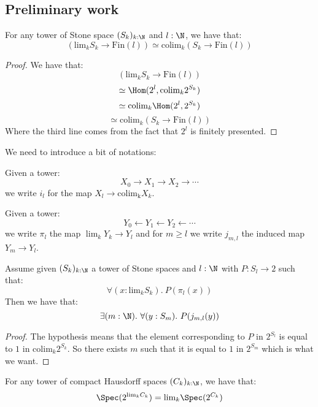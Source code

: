 \subsection{Preliminary work}

\begin{lemma}\label{factorisation-stone-finite}
For any tower of Stone space $(S_k)_{k:\N}$ and $l:\N$, we have that:
\[\left(\mathrm{lim}_kS_k\to \mathrm{Fin}(l)\right) \simeq \mathrm{colim}_k (S_k\to \mathrm{Fin}(l))\]
\end{lemma}

\begin{proof}
We have that:
\[\left(\mathrm{lim}_kS_k\to \mathrm{Fin}(l)\right) \]
\[\simeq \Hom(2^l, \mathrm{colim}_k 2^{S_k})\]
\[\simeq \mathrm{colim}_k \Hom(2^l, 2^{S_k}) \]
\[\simeq \mathrm{colim}_k (S_k\to \mathrm{Fin}(l))\]
Where the third line comes from the fact that $2^l$ is finitely presented.
\end{proof}

We need to introduce a bit of notations:

Given a tower: 
\[X_0 \to X_1\to X_2\to \cdots \]
we write $i_l$ for the map $X_l\to\mathrm{colim_k}X_k$.

Given a tower: 
\[Y_0 \leftarrow Y_1\leftarrow Y_2 \leftarrow \cdots\]
we write $\pi_l$ the map $\lim_k Y_k\to Y_l$ and for $m\geq l$ we write $j_{m,l}$ the induced map $Y_m\to Y_l$.

\begin{lemma}\label{sequential-limits-decidable}
Assume given $(S_k)_{k:\N}$ a tower of Stone spaces and $l:\N$ with $P:S_l\to 2$ such that:
\[\forall (x:\mathrm{lim}_kS_k).\ P(\pi_l(x))\]
Then we have that:
\[\exists(m:\N).\ \forall(y:S_m).\ P(j_{m,l}(y))\]
\end{lemma}

\begin{proof}
The hypothesis means that the element corresponding to $P$ in $2^{S_l}$ is equal to $1$ in $\mathrm{colim}_k2^{S_k}$. So there exists $m$ such that it is equal to $1$ in $2^{S_m}$ which is what we want.
\end{proof}

\begin{lemma}\label{stonification-sequential-limits}
For any tower of compact Hausdorff spaces $(C_k)_{k:\N}$, we have that:
\[\Spec(2^{\mathrm{lim}_k C_k}) = \mathrm{lim}_k\Spec(2^{C_k})\]
\end{lemma}

